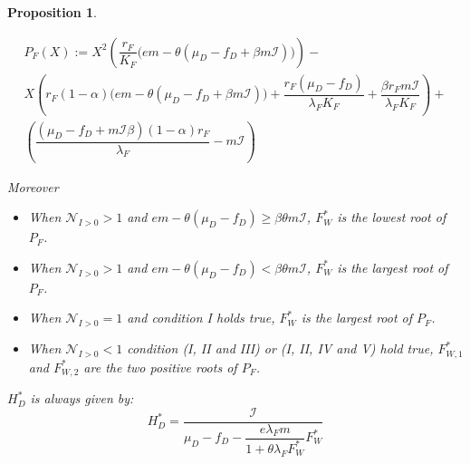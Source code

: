 \documentclass{article}
\newcommand{\lfw}{\lambda_{F}}
\newcommand{\lfw}{\lambda_{F}}
\newcommand{\cI}{\mathcal{I}}
\newtheorem{prop}{Proposition}
\begin{document}
\begin{prop}
\begin{itemize}
\begin{multline*}
P_F(X) := X^2 \left(\dfrac{r_F}{K_F} \Big(em - \theta(\mu_D-f_D + \beta m \cI) \Big) \right) - \\ 
X \left(r_F (1-\alpha)   \Big(em - \theta(\mu_D-f_D + \beta m \cI)  \Big) + \dfrac{r_F(\mu_D-f_D)}{\lfw K_F} + \dfrac{\beta r_F m \cI}{\lfw K_F} \right) + \\
 \left(\dfrac{(\mu_D - f_D + m \cI \beta)(1-\alpha) r_F}{\lfw} - m\cI \right)
\end{multline*}

Moreover
\begin{itemize}
\item When $\mathcal{N}_{I>0} > 1$ and $em - \theta(\mu_D - f_D) \geq \beta \theta m \cI$, $F_W^*$ is the lowest root of $P_F$.
\item When $\mathcal{N}_{I>0} > 1$ and $em - \theta(\mu_D - f_D) < \beta \theta m \cI$, $F_W^*$ is the largest root of $P_F$.
\item When $\mathcal{N}_{I>0} = 1$ and condition I holds true, $F_W^*$ is the largest root of $P_F$.
\item When $\mathcal{N}_{I>0} < 1$ condition (I, II and III) or (I, II, IV and V) hold true, $F_{W,1}^*$ and $F_{W,2}^*$ are the two positive roots of $P_F$.
\end{itemize}
$H_D^*$ is always given by:
$$
H_D^* = \dfrac{\cI}{\mu_D - f_D - \dfrac{e\lfw m }{1 + \theta \lfw F_W^*} F_W^*}
$$

\end{itemize}
\end{prop}
\end{document}

